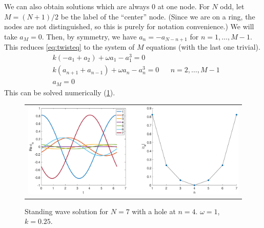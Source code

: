 \documentclass[12pt]{article}
\begin{document}
We can also obtain solutions which are always 0 at one node. For $N$ odd, let $M = (N+1)/2$ be the label of the ``center'' node. (Since we are on a ring, the nodes are not distinguished, so this is purely for notation convenience.) We will take $a_M = 0$. Then, by symmetry, we have $a_n = -a_{N-n+1}$ for $n = 1, \dots, M-1$. This reduces \cref{eq:twisteq} to the system of $M$ equations (with the last one trivial).
\begin{equation}\label{eq:twistoddzero}
\begin{aligned}
&k\left( -a_1 + a_2 \right) + \omega a_1 - a_1^3 = 0 \\
&k\left( a_{n+1} + a_{n-1} \right) + \omega a_n - a_n^3 = 0 && n = 2, \dots, M-1 \\
&a_M = 0
\end{aligned}
\end{equation}
This can be solved numerically (\cref{fig:hole7}).
\begin{figure}[H]
\begin{center}
\begin{tabular}{c}
\includegraphics[width=14cm]{images/twist7hole.eps}
\end{tabular}
\end{center}
\caption{Standing wave solution for $N = 7$ with a hole at $n=4$. $\omega = 1$, $k = 0.25$.}
\label{fig:hole7}
\end{figure}
\end{document}
